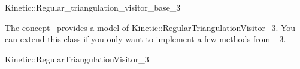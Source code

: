 

\begin{ccRefClass}{Kinetic::Regular_triangulation_visitor_base_3}


\ccDefinition
  
The concept \ccRefName\ provides a model of
Kinetic::RegularTriangulationVisitor\_3. You can extend this class if you only
want to implement a few methods from \_3.

\ccIsModel

Kinetic::RegularTriangulationVisitor\_3

\ccCreation
{}  %


\ccSeeAlso



\end{ccRefClass}


